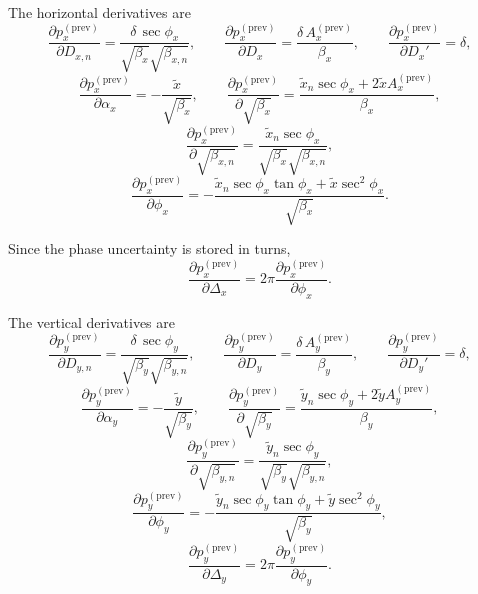 The horizontal derivatives are
\begin{equation}
\frac{\partial p_x^{(\mathrm{prev})}}{\partial D_{x,n}}
=
\frac{\delta\,\sec\phi_x}{\sqrt{\beta_x}\sqrt{\beta_{x,n}}},
\qquad
\frac{\partial p_x^{(\mathrm{prev})}}{\partial D_x}
=
\frac{\delta\,A_x^{(\mathrm{prev})}}{\beta_x},
\qquad
\frac{\partial p_x^{(\mathrm{prev})}}{\partial D_x'}
=
\delta,
\end{equation}
\begin{equation}
\frac{\partial p_x^{(\mathrm{prev})}}{\partial \alpha_x}
=
- \frac{\tilde x}{\sqrt{\beta_x}},
\qquad
\frac{\partial p_x^{(\mathrm{prev})}}{\partial \sqrt{\beta_x}}
=
\frac{\tilde x_n \sec\phi_x + 2\tilde x A_x^{(\mathrm{prev})}}{\beta_x},
\end{equation}
\begin{equation}
\frac{\partial p_x^{(\mathrm{prev})}}{\partial \sqrt{\beta_{x,n}}}
=
\frac{\tilde x_n \sec\phi_x}{\sqrt{\beta_x}\sqrt{\beta_{x,n}}},
\end{equation}
\begin{equation}
\frac{\partial p_x^{(\mathrm{prev})}}{\partial \phi_x}
=
- \frac{\tilde x_n \sec\phi_x\tan\phi_x + \tilde x \sec^2\phi_x}{\sqrt{\beta_x}}.
\end{equation}

Since the phase uncertainty is stored in turns,
\begin{equation}
\frac{\partial p_x^{(\mathrm{prev})}}{\partial \Delta_x}
=
2\pi \frac{\partial p_x^{(\mathrm{prev})}}{\partial \phi_x}.
\end{equation}

The vertical derivatives are
\begin{equation}
\frac{\partial p_y^{(\mathrm{prev})}}{\partial D_{y,n}}
=
\frac{\delta\,\sec\phi_y}{\sqrt{\beta_y}\sqrt{\beta_{y,n}}},
\qquad
\frac{\partial p_y^{(\mathrm{prev})}}{\partial D_y}
=
\frac{\delta\,A_y^{(\mathrm{prev})}}{\beta_y},
\qquad
\frac{\partial p_y^{(\mathrm{prev})}}{\partial D_y'}
=
\delta,
\end{equation}
\begin{equation}
\frac{\partial p_y^{(\mathrm{prev})}}{\partial \alpha_y}
=
- \frac{\tilde y}{\sqrt{\beta_y}},
\qquad
\frac{\partial p_y^{(\mathrm{prev})}}{\partial \sqrt{\beta_y}}
=
\frac{\tilde y_n \sec\phi_y + 2\tilde y A_y^{(\mathrm{prev})}}{\beta_y},
\end{equation}
\begin{equation}
\frac{\partial p_y^{(\mathrm{prev})}}{\partial \sqrt{\beta_{y,n}}}
=
\frac{\tilde y_n \sec\phi_y}{\sqrt{\beta_y}\sqrt{\beta_{y,n}}},
\end{equation}
\begin{equation}
\frac{\partial p_y^{(\mathrm{prev})}}{\partial \phi_y}
=
- \frac{\tilde y_n \sec\phi_y\tan\phi_y + \tilde y \sec^2\phi_y}{\sqrt{\beta_y}},
\end{equation}
\begin{equation}
\frac{\partial p_y^{(\mathrm{prev})}}{\partial \Delta_y}
=
2\pi \frac{\partial p_y^{(\mathrm{prev})}}{\partial \phi_y}.
\end{equation}

